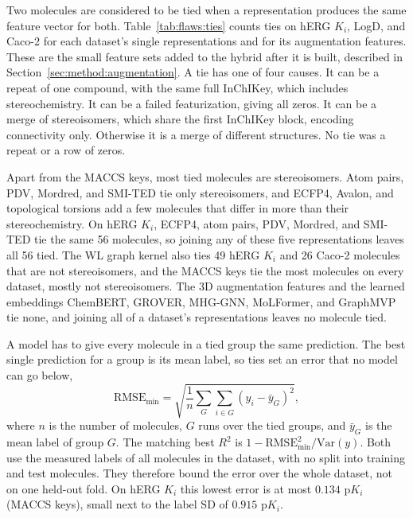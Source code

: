 Two molecules are considered to be tied when a representation produces the same feature vector for both. Table~\ref{tab:flaws:ties} counts ties on hERG $K_i$, LogD, and Caco-2 for each dataset's single representations and for its augmentation features. These are the small feature sets added to the hybrid after it is built, described in Section~\ref{sec:method:augmentation}. A tie has one of four causes. It can be a repeat of one compound, with the same full InChIKey, which includes stereochemistry. It can be a failed featurization, giving all zeros. It can be a merge of stereoisomers, which share the first InChIKey block, encoding connectivity only. Otherwise it is a merge of different structures. No tie was a repeat or a row of zeros.

Apart from the MACCS keys, most tied molecules are stereoisomers. Atom pairs, PDV, Mordred, and SMI-TED tie only stereoisomers, and ECFP4, Avalon, and topological torsions add a few molecules that differ in more than their stereochemistry. On hERG $K_i$, ECFP4, atom pairs, PDV, Mordred, and SMI-TED tie the same 56 molecules, so joining any of these five representations leaves all 56 tied. The WL graph kernel also ties 49 hERG $K_i$ and 26 Caco-2 molecules that are not stereoisomers, and the MACCS keys tie the most molecules on every dataset, mostly not stereoisomers. The 3D augmentation features and the learned embeddings ChemBERT, GROVER, MHG-GNN, MoLFormer, and GraphMVP tie none, and joining all of a dataset's representations leaves no molecule tied.

A model has to give every molecule in a tied group the same prediction. The best single prediction for a group is its mean label, so ties set an error that no model can go below,
\begin{equation}
\mathrm{RMSE}_{\min} = \sqrt{\frac{1}{n}\sum_{G}\sum_{i \in G}\left(y_i - \bar{y}_G\right)^2},
\end{equation}
where $n$ is the number of molecules, $G$ runs over the tied groups, and $\bar{y}_G$ is the mean label of group $G$. The matching best $R^2$ is $1 - \mathrm{RMSE}_{\min}^2 / \mathrm{Var}(y)$. Both use the measured labels of all molecules in the dataset, with no split into training and test molecules. They therefore bound the error over the whole dataset, not on one held-out fold. On hERG $K_i$ this lowest error is at most $0.134$ p$K_i$ (MACCS keys), small next to the label SD of $0.915$ p$K_i$.

